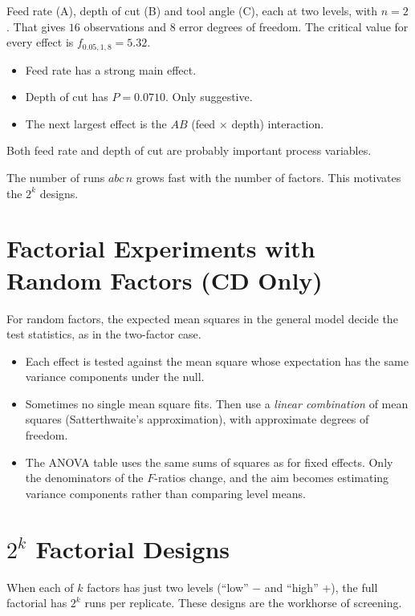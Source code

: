 \begin{example}
Feed rate (A), depth of cut (B) and tool angle (C), each at two levels, with $n=2$. That gives $16$ observations and $8$ error degrees of freedom. The critical value for every effect is $f_{0.05,1,8}=5.32$.
\begin{itemize}
  \item Feed rate has a strong main effect.
  \item Depth of cut has $P=0.0710$. Only suggestive.
  \item The next largest effect is the $AB$ (feed $\times$ depth) interaction.
\end{itemize}
Both feed rate and depth of cut are probably important process variables.
\end{example}

The number of runs $abc\,n$ grows fast with the number of factors. This motivates the $2^k$ designs.

\section{Factorial Experiments with Random Factors (CD Only)}

For random factors, the expected mean squares in the general model decide the test statistics, as in the two-factor case.
\begin{itemize}
  \item Each effect is tested against the mean square whose expectation has the same variance components under the null.
  \item Sometimes no single mean square fits. Then use a \emph{linear combination} of mean squares (Satterthwaite's approximation), with approximate degrees of freedom.
  \item The ANOVA table uses the same sums of squares as for fixed effects. Only the denominators of the $F$-ratios change, and the aim becomes estimating variance components rather than comparing level means.
\end{itemize}

\section{$2^k$ Factorial Designs}

When each of $k$ factors has just two levels (``low'' $-$ and ``high'' $+$), the full factorial has $2^k$ runs per replicate. These designs are the workhorse of screening.

